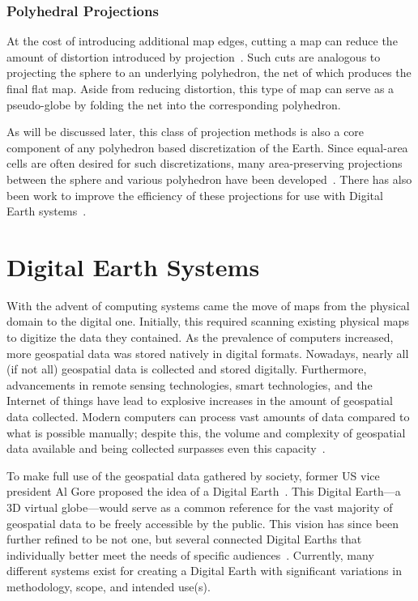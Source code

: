 \subsubsection{Polyhedral Projections}
At the cost of introducing additional map edges, cutting a map can reduce the amount of distortion introduced by projection~\cite{soliman2018optimal}.
Such cuts are analogous to projecting the sphere to an underlying polyhedron, the net of which produces the final flat map.
Aside from reducing distortion, this type of map can serve as a pseudo-globe by folding the net into the corresponding polyhedron.


As will be discussed later, this class of projection methods is also a core component of any polyhedron based discretization of the Earth.
Since equal-area cells are often desired for such discretizations, many area-preserving projections between the sphere and various polyhedron have been developed~\cite{bradley1946equal, snyder1992equal, van2006slice, rocsca2011uniform, rocsca2012area, holhocs2014octahedral}.
There has also been work to improve the efficiency of these projections for use with Digital Earth systems~\cite{harrison2011optimization}.


\section{Digital Earth Systems}
With the advent of computing systems came the move of maps from the physical domain to the digital one.
Initially, this required scanning existing physical maps to digitize the data they contained.
As the prevalence of computers increased, more geospatial data was stored natively in digital formats.
Nowadays, nearly all (if not all) geospatial data is collected and stored digitally.
Furthermore, advancements in remote sensing technologies, smart technologies, and the Internet of things have lead to explosive increases in the amount of geospatial data collected.
Modern computers can process vast amounts of data compared to what is possible manually; despite this, the volume and complexity of geospatial data available and being collected surpasses even this capacity~\cite{lee2015geospatial}.


To make full use of the geospatial data gathered by society, former US vice president Al Gore proposed the idea of a Digital Earth~\cite{gore1998}.
This Digital Earth---a 3D virtual globe---would serve as a common reference for the vast majority of geospatial data to be freely accessible by the public.
This vision has since been further refined to be not one, but several connected Digital Earths that individually better meet the needs of specific audiences~\cite{goodchild2012next}.
Currently, many different systems exist for creating a Digital Earth with significant variations in methodology, scope, and intended use(s).



